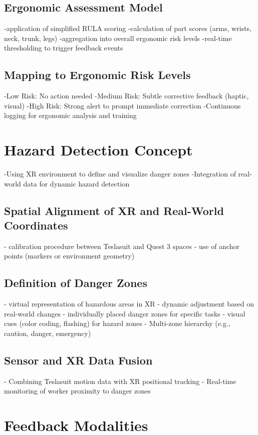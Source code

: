 \subsection{Ergonomic Assessment Model}
-application of simplified RULA scoring
-calculation of part scores (arms, wrists, neck, trunk, legs)
-aggregation into overall ergonomic risk levels
-real-time thresholding to trigger feedback events
\subsection{Mapping to Ergonomic Risk Levels}
-Low Risk: No action needed
-Medium Risk: Subtle corrective feedback (haptic, visual)
-High Risk: Strong alert to prompt immediate correction
-Continuous logging for ergonomic analysis and training

\section{Hazard Detection Concept}
-Using XR environment to define and visualize danger zones
-Integration of real-world data for dynamic hazard detection
\subsection{Spatial Alignment of XR and Real-World Coordinates}
- calibration procedure between Teslasuit and Quest 3 spaces
- use of anchor points (markers or environment geometry)

\subsection{Definition of Danger Zones}
- virtual representation of hazardous areas in XR
- dynamic adjustment based on real-world changes
- individually placed danger zones for specific tasks
- visual cues (color coding, flashing) for hazard zones
- Multi-zone hierarchy (e.g., caution, danger, emergency)

\subsection{Sensor and XR Data Fusion}
- Combining Teslasuit motion data with XR positional tracking
- Real-time monitoring of worker proximity to danger zones


\section{Feedback Modalities}
